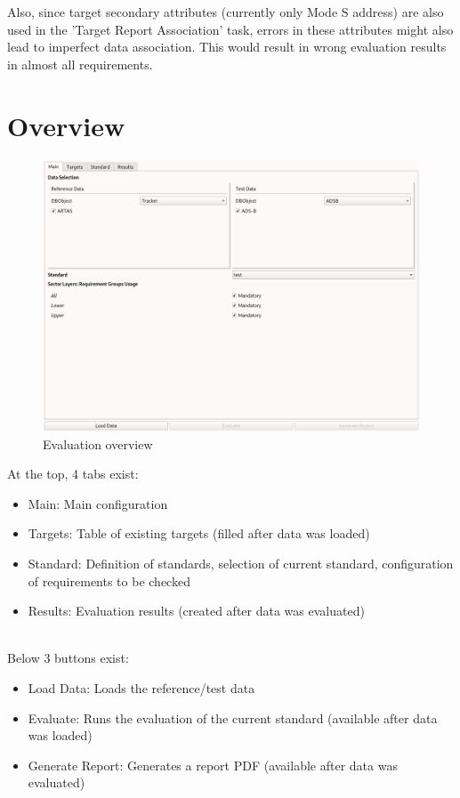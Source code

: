 Also, since target secondary attributes (currently only Mode S address) are also used in the 'Target Report Association' task, errors in these attributes might also lead to imperfect data association. This would result in wrong evaluation results in almost all requirements.

\section{Overview}
\label{sec:eval_overview} 

\begin{figure}[H]
  \hspace*{-2cm}
    \includegraphics[width=18cm,frame]{../screenshots/eval_overview.png}
  \caption{Evaluation overview}
\end{figure}

At the top, 4 tabs exist:
\begin{itemize}  
\item Main: Main configuration
\item Targets: Table of existing targets (filled after data was loaded)
\item Standard: Definition of standards, selection of current standard, configuration of requirements to be checked
\item Results: Evaluation results (created after data was evaluated)
\end{itemize}
\ \\

Below 3 buttons exist:
\begin{itemize}  
\item Load Data: Loads the reference/test data
\item Evaluate: Runs the evaluation of the current standard (available after data was loaded)
\item Generate Report: Generates a report PDF (available after data was evaluated)
\end{itemize}
\ \\

